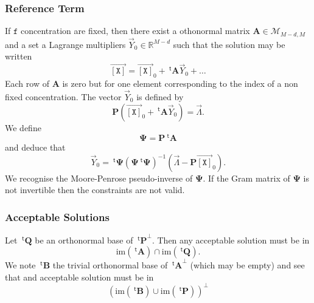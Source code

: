 \documentclass[aps,twocolumn]{revtex4}
\newcommand{\myconc}[1]{\left\lbrack #1 \right\rbrack}
\newcommand{\mychem}[1]{{\mathtt{#1}}}
\newcommand{\mymat}[1]{\boldsymbol{#1}}
\newcommand{\mytrn}[1]{{\!\!~^{\mathsf{t}}{#1}}}
\newcommand{\myvec}[1]{\overrightarrow{#1}}
\newcommand{\vecX}{\myvec{\myconc{\mychem{X}}}}
\newcommand{\fixed}{\mathtt{f}}
\begin{document}
\subsubsection{Reference Term}
If $\fixed$ concentration are fixed, then there exist a othonormal matrix $\mymat{A}\in\mathcal{M}_{M-d,M}$ and
a set a Lagrange multipliers $\vec{Y}_0\in\mathbb{R}^{M-d}$ such that the solution may be written
\begin{equation}
	\vecX = \vecX_0 + \mytrn{\mymat{A}}\vec{Y}_0 + \ldots
\end{equation}
Each row of $\mymat{A}$ is zero but for one element corresponding to the index of a non fixed concentration.
The vector $\vec{Y}_0$ is defined by
$$
	\mymat{P}\left(\vecX_0+\mytrn{\mymat{A}}\vec{Y}_0\right) = \vec\Lambda.
$$
We define
$$
	\mymat{\Psi} = \mymat{P}\mytrn{\mymat{A}}
$$
and deduce that
$$
	\vec{Y}_0 = \mytrn{\mymat{\Psi}} \left(\mymat{\Psi} \mytrn{\mymat{\Psi}}\right)^{-1}\left( \vec{\Lambda} - \mymat{P}\vecX_0\right).
$$
We recognise the Moore-Penrose pseudo-inverse of $\mymat{\Psi}$. If the Gram matrix of $\mymat{\Psi}$ is not invertible then
the constraints are not valid.

\subsubsection{Acceptable Solutions}
Let $\mytrn{\mymat{Q}}$ be an orthonormal base of $\mytrn{\mymat{P}}^\perp$. Then any acceptable solution must be in
$$
	\mathrm{im}(\mytrn{\mymat{A}}) \cap \mathrm{im}(\mytrn{\mymat{Q}}).
$$
We note $\mytrn{\mymat{B}}$ the trivial orthonormal base of  $\mytrn{\mymat{A}}^\perp$ (which may be empty)
and see that and acceptable solution must be in
$$
	\left( 
	\mathrm{im}(\mytrn{\mymat{B}})
	\cup
	\mathrm{im}(\mytrn{\mymat{P}})
	\right)^\perp
$$
\end{document}
